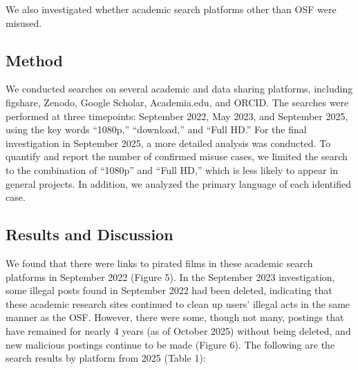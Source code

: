 \documentclass[authordate, meta]{jote-new-article}
\begin{document}
	We also investigated whether academic search platforms other than OSF were misused.







	\subsection{Method }



	We conducted searches on several academic and data sharing platforms, including figshare, Zenodo, Google Scholar, Academia.edu, and ORCID. The searches were performed at three timepoints: September 2022, May 2023, and September 2025, using the key words “1080p,” “download,” and “Full HD.” For the final investigation in September 2025, a more detailed analysis was conducted. To quantify and report the number of confirmed misuse cases, we limited the search to the combination of “1080p” and “Full HD,” which is less likely to appear in general projects. In addition, we analyzed the primary language of each identified case.







	\subsection{Results and Discussion }



	We found that there were links to pirated films in these academic search platforms in September 2022 (Figure 5). In the September 2023 investigation, some illegal posts found in September 2022 had been deleted, indicating that these academic research sites continued to clean up users' illegal acts in the same manner as the OSF. However, there were some, though not many, postings that have remained for nearly 4 years (as of October 2025) without being deleted, and new malicious postings continue to be made (Figure 6). The following are the search results by platform from 2025 (Table 1):
\end{document}
